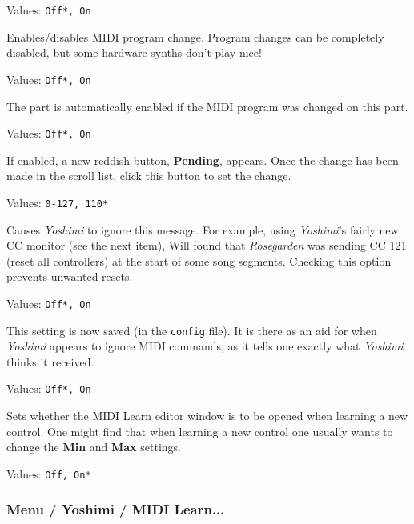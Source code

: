 
   Values: \texttt{Off*, On}

   Enables/disables MIDI program change.
   Program changes can be completely disabled, but some hardware synths don't
   play nice!


   Values: \texttt{Off*, On}

   The part is automatically enabled if the MIDI program was changed on this
   part.


   Values: \texttt{Off*, On}

   If enabled, a new reddish button, \textbf{Pending}, appears.
   Once the change has been made in the scroll list, click this button
   to set the change.

   Values: \texttt{0-127, 110*}

   Causes \textsl{Yoshimi} to ignore this message.
   For example, using \textsl{Yoshimi}'s fairly new CC monitor (see the next
   item), Will found that \textsl{Rosegarden} was sending CC 121 (reset all
   controllers) at the start of some song segments.  Checking this option
   prevents unwanted resets.

   Values: \texttt{Off*, On}

   This setting is now saved (in the \texttt{config} file). It is there
   as an aid for when \textsl{Yoshimi} appears to ignore MIDI commands,
   as it tells one exactly what \textsl{Yoshimi} thinks it received.

   Values: \texttt{Off*, On}

   Sets whether the MIDI Learn editor window is to be opened when learning a
   new control. One might find that when learning a new control one
   usually wants to change the \textbf{Min} and \textbf{Max} settings.

   Values: \texttt{Off, On*}

\subsubsection{Menu / Yoshimi / MIDI Learn...}
\label{subsubsec:menu_yoshimi_midi_learn}

